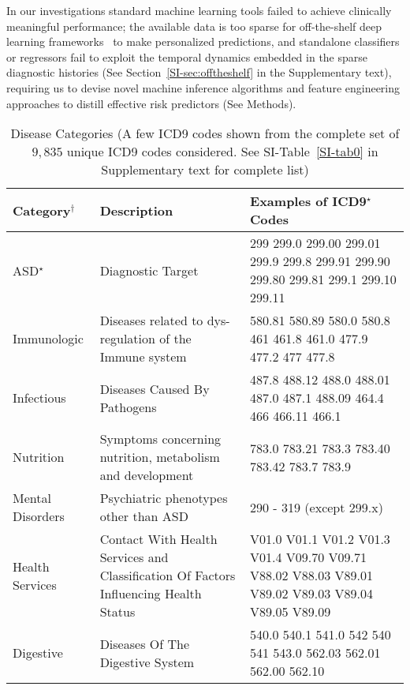 \documentclass[onecolumn,,10pt]{IEEEtran}
\renewcommand{\captionN}[1]{\caption{\color{CadetBlue4!80!black} \sffamily \fontsize{9}{10}\selectfont #1  }}
\newif\ifFIGS
\begin{document}
In our investigations  standard machine learning  tools failed to achieve clinically meaningful performance; the available data is too sparse for  off-the-shelf deep learning frameworks~\cite{pmid27185194} to make personalized predictions, and standalone classifiers or regressors fail to exploit the temporal dynamics embedded in the sparse diagnostic histories (See Section~\ref{SI-sec:offtheshelf} in the Supplementary text), requiring us to devise novel machine inference algorithms and feature engineering approaches to distill effective risk predictors (See Methods). 
\begin{table}[t]
  \captionN{Disease Categories (A few ICD9 codes shown from the complete set of $9,835$ unique ICD9 codes considered. See SI-Table~\ref{SI-tab0} in  Supplementary text for complete list)}\label{tab0}
  \small\color{black!90}
  \begin{tabular}{L{1in}|L{2in} | |L{3in}}\hline
    \bf\sffamily   Category$^\dag$ & \bf\sffamily  Description  & \bf\sffamily  Examples of ICD9$^\star$ Codes \\\hline
{}ASD$^\star$ & Diagnostic Target & 299 299.0 299.00 299.01 299.9 299.8 299.91 299.90 299.80 299.81 299.1 299.10 299.11\\\hline
{}Immunologic & Diseases related to dys-regulation of the Immune system &580.81 580.89 580.0 580.8 461 461.8 461.0 477.9 477.2 477 477.8\\\hline
{}Infectious & Diseases Caused By Pathogens &487.8 488.12 488.0 488.01 487.0 487.1 488.09 464.4 466 466.11 466.1\\\hline
 Nutrition &  Symptoms concerning nutrition, metabolism and development   & 783.0 783.21 783.3 783.40 783.42 783.7 783.9\\\hline
   Mental Disorders & Psychiatric phenotypes other than ASD & 290 -  319 (except 299.x) \\\hline
    Health Services &Contact With   Health Services and Classification Of Factors Influencing Health Status  & V01.0 V01.1 V01.2 V01.3 V01.4   V09.70 V09.71 V88.02 V88.03 V89.01 V89.02 V89.03 V89.04 V89.05 V89.09 \\\hline
    Digestive & Diseases Of The Digestive System &540.0 540.1 541.0 542 540 541 543.0 562.03 562.01 562.00 562.10\\\hline

\end{tabular}
\end{table}
\end{document}
